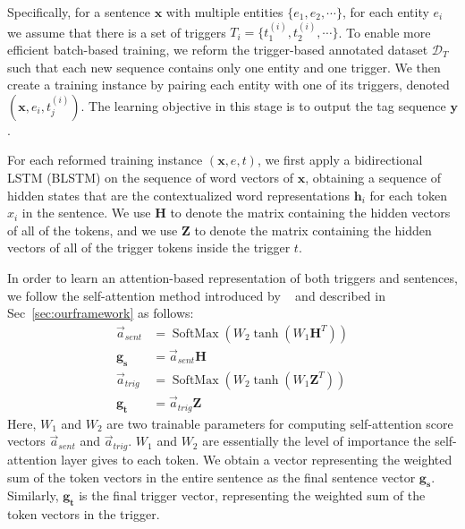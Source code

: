 Specifically,
for a sentence $\mathbf{x}$ with multiple entities $\{e_1, e_2,\cdots\}$, for each entity $e_i$ we assume that there is a set of triggers $T_i=\{t^{(i)}_1, t^{(i)}_2, \cdots\}$.
To enable more efficient batch-based training, we reform the trigger-based annotated dataset $\mathcal{D}_{T}$ such that each new sequence contains only one entity and one trigger.
We then create a training instance by pairing each entity with one of its triggers, denoted $(\mathbf{x}, e_i, t^{(i)}_j)$.
The learning objective in this stage is to output the tag sequence $\mathbf{y}$. %


For each reformed training instance $(\mathbf{x}, e, t)$, we first apply a bidirectional LSTM (BLSTM) on the sequence of word vectors 
of $\mathbf{x}$, obtaining a sequence of hidden states that are the contextualized word representations $\mathbf{h}_i$ for each token $x_i$ in the sentence. 
We use $\mathbf{H}$ to denote the matrix containing the hidden vectors of all of the tokens, and we use $\mathbf{Z}$ to denote the matrix containing the hidden vectors of all of the trigger tokens inside the trigger $t$.

In order to learn an attention-based
representation of both triggers and sentences, we follow the self-attention method introduced by ~\cite{selfattentive} and described in Sec~\ref{sec:ourframework} as follows:
{
{
		\begin{align*} 
			\vec{a}_{sent}&=\operatorname{SoftMax}\left(W_{2} \tanh \left(W_{1} \mathbf{H}^{T}\right)\right)\\
			\mathbf{g_s}&=\vec{a}_{sent}\mathbf{H}\\
			\vec{a}_{trig}&=\operatorname{SoftMax}\left(W_{2} \tanh \left(W_{1} \mathbf{Z}^{T}\right)\right)\\
			\mathbf{g_t}&=\vec{a}_{trig}\mathbf{Z}
		\end{align*} 
	}
}  
Here, $W_1$ and $W_2$ are two trainable parameters for computing self-attention score vectors $\vec{a}_{sent}$ and $\vec{a}_{trig}$. $W_1$ and $W_2$ are essentially the level of importance the self-attention layer gives to each token.
We obtain a vector representing the weighted sum of the token vectors in the entire sentence as the final sentence vector $\mathbf{g_s}$. Similarly, $\mathbf{g_t}$ is the final trigger vector, representing the weighted sum of the token vectors in the trigger.

